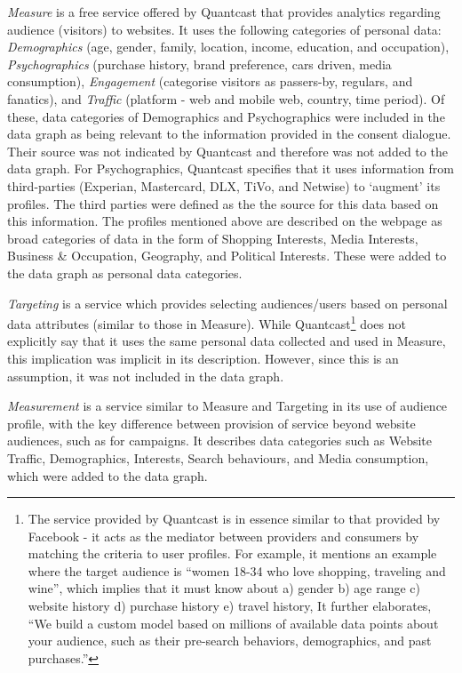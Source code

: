 \textit{Measure} is a free service offered by Quantcast that provides analytics regarding audience (visitors) to websites. It uses the following categories of personal data: \textit{Demographics} (age, gender, family, location, income, education, and occupation), \textit{Psychographics} (purchase history, brand preference, cars driven, media consumption), \textit{Engagement} (categorise visitors as passers-by, regulars, and fanatics), and \textit{Traffic} (platform - web and mobile web, country, time period). Of these, data categories of Demographics and Psychographics were included in the data graph as being relevant to the information provided in the consent dialogue. Their source was not indicated by Quantcast and therefore was not added to the data graph.
For Psychographics, Quantcast specifies that it uses information from third-parties (Experian, Mastercard, DLX, TiVo, and Netwise) to `augment' its profiles. The third parties were defined as the the source for this data based on this information.
The profiles mentioned above are described on the webpage as broad categories of data in the form of Shopping Interests, Media Interests, Business \& Occupation, Geography, and Political Interests. These were added to the data graph as personal data categories.

\textit{Targeting} is a service which provides selecting audiences/users based on personal data attributes (similar to those in Measure). While Quantcast\footnote{The service provided by Quantcast is in essence similar to that provided by Facebook - it acts as the mediator between providers and consumers by matching the criteria to user profiles. For example, it mentions an example where the target audience is ``women 18-34 who love shopping, traveling and wine'', which implies that it must know about a) gender b) age range c) website history d) purchase history e) travel history, It further elaborates, ``We build a custom model based on millions of available data points about your audience, such as their pre-search behaviors, demographics, and past purchases.''} does not explicitly say that it uses the same personal data collected and used in Measure, this implication was implicit in its description. However, since this is an assumption, it was not included in the data graph.

\textit{Measurement} is a service similar to Measure and Targeting in its use of audience profile, with the key difference between provision of service beyond website audiences, such as for campaigns. It describes data categories such as Website Traffic, Demographics, Interests, Search behaviours, and Media consumption, which were added to the data graph.

